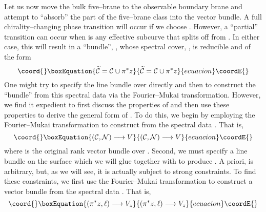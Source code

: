 \documentclass[a4paper,12pt]{article}
\numberwithin{equation}{section}
\def\cC{{\mathcal C}}
\def\cN{{\mathcal N}}
\theoremstyle{plain}
\begin{document}
Let us now move the bulk five--brane to the observable 
boundary brane and attempt to ``absorb'' the \coordHE{} part of the 
five--brane class into the vector bundle. A full chirality--changing phase
transition will occur if we choose \coordHE{}. However, a
``partial'' transition can occur when \coordHE{} is any effective subcurve that
splits off from \coordHE{}. In either case, this will result in a
``bundle'', \coordHE{}, whose spectral cover, \myHighlight{$\widetilde{\cC}$}\coordHE{}, is
reducible and of the form
\begin{equation}\coord{}\boxEquation{
\widetilde{\cC}= \cC\cup \pi^{*}z
\label{eq:59}
}{
\widetilde{\cC}= \cC\cup \pi^{*}z
}{ecuacion}\coordE{}\end{equation}
One might try to specify the line bundle \myHighlight{$\widetilde{\cN}$}\coordHE{} over
\myHighlight{$\widetilde{\cC}$}\coordHE{} directly and then to construct the ``bundle'' \coordHE{} from
this spectral data via the Fourier--Mukai transformation. However, we find it
expedient to first discuss the properties of \coordHE{}
and then use these properties to derive the general form of \myHighlight{$\widetilde{\cN}$}\coordHE{}.
To do this, we begin by employing 
the Fourier--Mukai transformation to construct \coordHE{} from the spectral data
\myHighlight{$(\cC, \cN)$}\coordHE{}. That is,
\begin{equation}\coord{}\boxEquation{
({\cal{C}}, \cN) \longrightarrow V
\label{eq:60}
}{
({\cal{C}}, \cN) \longrightarrow V
}{ecuacion}\coordE{}\end{equation}
where \coordHE{} is the original rank \coordHE{} vector bundle over \coordHE{}.
Second, we must specify a line bundle \myHighlight{$\ell$}\coordHE{} on the surface
\coordHE{} which we will glue together with \myHighlight{$\cN$}\coordHE{} to produce
\myHighlight{$\widetilde{\cN}$}\coordHE{}. A
priori, \myHighlight{$\ell$}\coordHE{} is arbitrary, but, as we will see, it is actually subject to
strong constraints. To find these constraints, we first use the Fourier--Mukai
transformation to construct a vector bundle \coordHE{} from the spectral data 
\coordHE{}. That is,
\begin{equation}\coord{}\boxEquation{
(\pi^{*}z, \ell) \longrightarrow V_{z}
\label{eq:61}
}{
(\pi^{*}z, \ell) \longrightarrow V_{z}
}{ecuacion}\coordE{}\end{equation}
\end{document}
